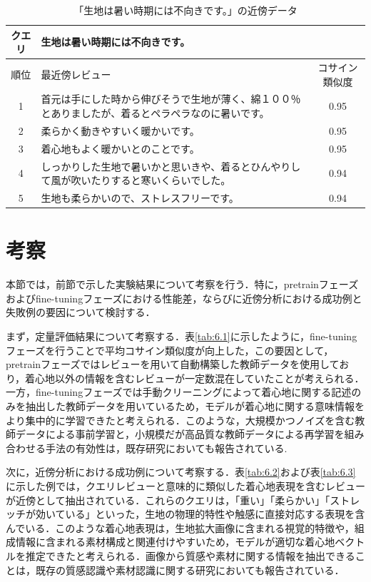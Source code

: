 \documentclass[a4paper,12pt]{jreport}
\begin{document}
\begin{table}[tbh]
\begin{center}
\caption{「生地は暑い時期には不向きです。」の近傍データ}
\vspace{7mm}
\label{tab:6.4}
\begin{tabular}{|c|p{9cm}|c|}
\hline
クエリ &
\multicolumn{2}{p{11cm}|}{生地は暑い時期には不向きです。}
\\ \hline
順位 & 最近傍レビュー & コサイン類似度 \\ \hline
1 &首元は手にした時から伸びそうで生地が薄く、綿１００％とありましたが、着るとペラペラなのに暑いです。 & 0.95 \\ \hline
2 & 柔らかく動きやすいく暖かいです。 & 0.95 \\ \hline
3 & 着心地もよく暖かいとのことです。 & 0.95 \\ \hline
4 & しっかりした生地で暑いかと思いきや、着るとひんやりして風が吹いたりすると寒いくらいでした。 & 0.94 \\ \hline
5 &生地も柔らかいので、ストレスフリーです。 & 0.94 \\ \hline
\end{tabular}
\end{center}
\end{table}

\section{考察}
本節では，前節で示した実験結果について考察を行う．特に，pretrainフェーズおよびfine-tuningフェーズにおける性能差，ならびに近傍分析における成功例と失敗例の要因について検討する．

まず，定量評価結果について考察する．表\ref{tab:6.1}に示したように，fine-tuning フェーズを行うことで平均コサイン類似度が向上した，この要因として，pretrainフェーズではレビューを用いて自動構築した教師データを使用しており，着心地以外の情報を含むレビューが一定数混在していたことが考えられる．一方，fine-tuningフェーズでは手動クリーニングによって着心地に関する記述のみを抽出した教師データを用いているため，モデルが着心地に関する意味情報をより集中的に学習できたと考えられる．このような，大規模かつノイズを含む教師データによる事前学習と，小規模だが高品質な教師データによる再学習を組み合わせる手法の有効性は，既存研究においても報告されている\cite{Hinton}.

次に，近傍分析における成功例について考察する．表\ref{tab:6.2}および表\ref{tab:6.3} に示した例では，クエリレビューと意味的に類似した着心地表現を含むレビューが近傍として抽出されている．これらのクエリは，「重い」「柔らかい」「ストレッチが効いている」といった，生地の物理的特性や触感に直接対応する表現を含んでいる．このような着心地表現は，生地拡大画像に含まれる視覚的特徴や，組成情報に含まれる素材構成と関連付けやすいため，モデルが適切な着心地ベクトルを推定できたと考えられる．画像から質感や素材に関する情報を抽出できることは，既存の質感認識や素材認識に関する研究においても報告されている\cite{Cimpoi}\cite{Bell}．
\end{document}
